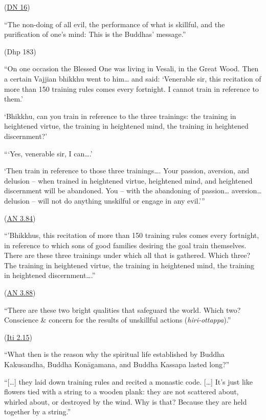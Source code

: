 (\href{https://suttacentral.net/dn16/en/sujato}{DN 16})

``The non-doing of all evil, the performance of what is skillful, and
the purification of one's mind: This is the Buddhas' message.''

(Dhp 183)

``On one occasion the Blessed One was living in Vesali, in the Great
Wood. Then a certain Vajjian bhikkhu went to him\ldots{} and said:
`Venerable sir, this recitation of more than 150 training rules comes
every fortnight. I cannot train in reference to them.'

`Bhikkhu, can you train in reference to the three trainings: the
training in heightened virtue, the training in heightened mind, the
training in heightened discernment?'

```Yes, venerable sir, I can\ldots.'

`Then train in reference to those three trainings\ldots. Your passion,
aversion, and delusion -- when trained in heightened virtue, heightened
mind, and heightened discernment will be abandoned. You -- with the
abandoning of passion\ldots{} aversion\ldots{} delusion -- will not do
anything unskilful or engage in any evil.'''

(\href{https://suttacentral.net/an3.84/en/sujato}{AN 3.84})

``'Bhikkhus, this recitation of more than 150 training rules comes every
fortnight, in reference to which sons of good families desiring the goal
train themselves. There are these three trainings under which all that
is gathered. Which three? The training in heightened virtue, the
training in heightened mind, the training in heightened
discernment\ldots.''

(\href{https://suttacentral.net/an3.88/en/sujato}{AN 3.88})

``There are these two bright qualities that safeguard the world. Which
two? Conscience \& concern for the results of unskillful actions
(\emph{hiri-ottappa}).''

(\href{https://www.accesstoinsight.org/tipitaka/kn/iti/iti.2.028-049.than.html\#iti-042}{Iti
2.15})

``What then is the reason why the spiritual life established by Buddha
Kakusandha, Buddha Konāgamana, and Buddha Kassapa lasted long?''

``{[}\ldots{]} they laid down training rules and recited a monastic
code. {[}\ldots{]} It's just like flowers tied with a string to a wooden
plank: they are not scattered about, whirled about, or destroyed by the
wind. Why is that? Because they are held together by a string.''

